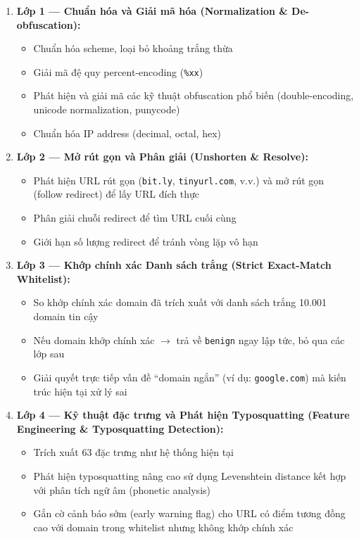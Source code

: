 \documentclass[a4paper,12pt]{article}
\begin{document}
\begin{enumerate}
    \item \textbf{Lớp 1 --- Chuẩn hóa và Giải mã hóa (Normalization \& De-obfuscation):}
    \begin{itemize}
        \item Chuẩn hóa scheme, loại bỏ khoảng trắng thừa
        \item Giải mã đệ quy percent-encoding (\texttt{\%xx})
        \item Phát hiện và giải mã các kỹ thuật obfuscation phổ biến (double-encoding, unicode normalization, punycode)
        \item Chuẩn hóa IP address (decimal, octal, hex)
    \end{itemize}

    \item \textbf{Lớp 2 --- Mở rút gọn và Phân giải (Unshorten \& Resolve):}
    \begin{itemize}
        \item Phát hiện URL rút gọn (\texttt{bit.ly}, \texttt{tinyurl.com}, v.v.) và mở rút gọn (follow redirect) để lấy URL đích thực
        \item Phân giải chuỗi redirect để tìm URL cuối cùng
        \item Giới hạn số lượng redirect để tránh vòng lặp vô hạn
    \end{itemize}

    \item \textbf{Lớp 3 --- Khớp chính xác Danh sách trắng (Strict Exact-Match Whitelist):}
    \begin{itemize}
        \item So khớp chính xác domain đã trích xuất với danh sách trắng 10.001 domain tin cậy
        \item Nếu domain khớp chính xác $\rightarrow$ trả về \texttt{benign} ngay lập tức, bỏ qua các lớp sau
        \item Giải quyết trực tiếp vấn đề ``domain ngắn'' (ví dụ: \texttt{google.com}) mà kiến trúc hiện tại xử lý sai
    \end{itemize}

    \item \textbf{Lớp 4 --- Kỹ thuật đặc trưng và Phát hiện Typosquatting (Feature Engineering \& Typosquatting Detection):}
    \begin{itemize}
        \item Trích xuất 63 đặc trưng như hệ thống hiện tại
        \item Phát hiện typosquatting nâng cao sử dụng Levenshtein distance kết hợp với phân tích ngữ âm (phonetic analysis)
        \item Gắn cờ cảnh báo sớm (early warning flag) cho URL có điểm tương đồng cao với domain trong whitelist nhưng không khớp chính xác
    \end{itemize}


\end{enumerate}
\end{document}
